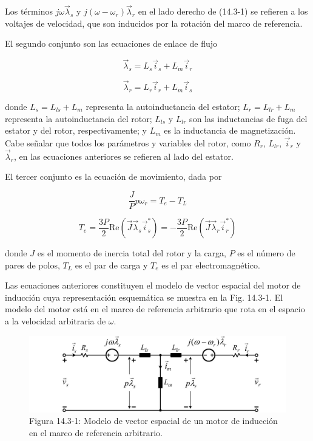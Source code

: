 \documentclass[letterpaper,12pt]{article}
\begin{document}
Los términos $j\omega \vec{\lambda}_s$ y $j(\omega - \omega_r)\vec{\lambda}_r$ en el lado derecho de (14.3-1) se refieren a los voltajes de velocidad, que son inducidos por la rotación del marco de referencia.

El segundo conjunto son las ecuaciones de enlace de flujo

\begin{equation}
\vec{\lambda}_s = L_s \vec{i}_s + L_m \vec{i}_r \tag{14.3-2}
\end{equation}

\begin{equation}
\vec{\lambda}_r = L_r \vec{i}_r + L_m \vec{i}_s \tag{14.3-2}
\end{equation}

donde $L_s = L_{ls} + L_m$ representa la autoinductancia del estator; $L_r = L_{lr} + L_m$ representa la autoinductancia del rotor; $L_{ls}$ y $L_{lr}$ son las inductancias de fuga del estator y del rotor, respectivamente; y $L_m$ es la inductancia de magnetización. Cabe señalar que todos los parámetros y variables del rotor, como $R_r$, $L_{lr}$, $\vec{i}_r$ y $\vec{\lambda}_r$, en las ecuaciones anteriores se refieren al lado del estator.

El tercer conjunto es la ecuación de movimiento, dada por

\begin{equation}
\frac{J}{P} p\omega_r = T_e - T_L \tag{14.3-3}
\end{equation}

\begin{equation}
T_e = \frac{3P}{2} \text{Re}(\vec{J} \vec{\lambda}_s \vec{i}_s^*) = -\frac{3P}{2} \text{Re}(\vec{J} \vec{\lambda}_r \vec{i}_r^*) \tag{14.3-3}
\end{equation}

donde $J$ es el momento de inercia total del rotor y la carga, $P$ es el número de pares de polos, $T_L$ es el par de carga y $T_e$ es el par electromagnético.

Las ecuaciones anteriores constituyen el modelo de vector espacial del motor de inducción cuya representación esquemática se muestra en la Fig. 14.3-1. El modelo del motor está en el marco de referencia arbitrario que rota en el espacio a la velocidad arbitraria de $\omega$.

\begin{figure}[ht]
\centering
\includegraphics{graficos/img03.jpg}
\caption{Figura 14.3-1: Modelo de vector espacial de un motor de inducción en el marco de referencia arbitrario.}
\end{figure}
\FloatBarrier
\end{document}
